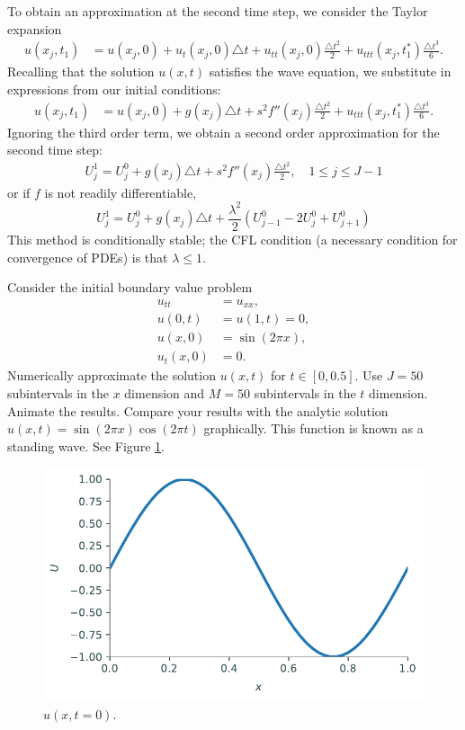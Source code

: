 To obtain an approximation at the second time step, we consider the Taylor expansion
\begin{align*}
	u(x_j,t_1) &= u(x_j, 0) + u_t(x_j,0) \triangle t + u_{tt}(x_j,0) \frac{\triangle t^2}{2} + u_{ttt}(x_j,t_1^*) \frac{\triangle t^3}{6}.
\end{align*}
Recalling that the solution $u(x,t)$ satisfies the wave equation, we substitute in expressions from our initial conditions:
\begin{align*}
	u(x_j,t_1) &= u(x_j, 0) +  g(x_j) \triangle t+ s^2 f''(x_j)\frac{\triangle t^2}{2} +  u_{ttt}(x_j,t_1^*) \frac{\triangle t^3}{6}.
\end{align*}
Ignoring the third order term, we obtain a second order approximation for the second time step:
\begin{align}
U_{j}^{1}= U_{j}^{0} + g(x_j) \triangle t+ s^2 f''(x_j) \frac{\triangle t^2}{2}, \quad 1 \leq j \leq J-1
\end{align}
or if $f$ is not readily differentiable,
\[U_{j}^{1}= U_{j}^{0} + g(x_j) \triangle t+ \frac{\lambda^2}{2} (U^0_{j-1} -2 U^0_j + U^0_{j+1})\]
This method is conditionally stable; the CFL condition (a necessary condition for convergence of PDEs) is that $\lambda \leq 1$.

\begin{problem}
\label{prob:prob1}
Consider the initial boundary value problem
\begin{align*}
	u_{tt} &= u_{xx}, \\
	u(0,t) &= u(1,t) = 0, \\
	u(x,0) &= \sin(2 \pi x),\\
	u_t(x,0) &= 0.
\end{align*}
Numerically approximate the solution $u(x,t)$ for $t \in \left[0,0.5\right]$.
Use $J=50$ subintervals in the $x$ dimension and $M=50$ subintervals in the $t$ dimension.
Animate the results.
Compare your results with the analytic solution $u(x,t) = \sin{(2 \pi x)} \cos{(2 \pi t)}$ graphically.
This function is known as a standing wave.
See Figure \ref{fig:prob1}.

\begin{figure}[H]
\centering
\includegraphics[width=\textwidth]{figures/prob1.pdf}
\caption{$u(x,t=0)$.}
\label{fig:prob1}
\end{figure}
\end{problem}

